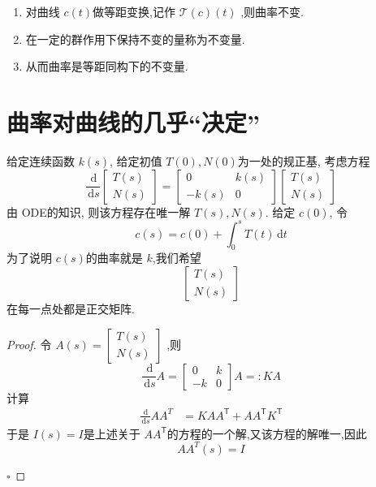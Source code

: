 \documentclass[../../古典微分几何.tex]{subfiles}
\begin{document}
\begin{remark}
    \begin{enumerate}
        \item 对曲线 \(  c \left( t \right)  \)做等距变换,记作 \(  \mathcal{T}\left( c \right)\left( t \right)    \)  ,则曲率不变.
        \item   在一定的群作用下保持不变的量称为不变量.
        \item 从而曲率是等距同构下的不变量.
    \end{enumerate}
    
    
\end{remark}

\section{曲率对曲线的几乎“决定”}

给定连续函数 \(  k\left( s \right)   \), 给定初值 \(  T\left( 0 \right),N\left( 0 \right)    \)为一处的规正基, 考虑方程 \[
\frac{\,\mathrm{d}  }{\,\mathrm{d} s } \begin{bmatrix} 
    T\left( s \right)\\ 
     N\left( s \right)   
\end{bmatrix} =  \begin{bmatrix} 
    0& k\left( s \right)\\ 
     -k\left( s \right)&0   
\end{bmatrix} \begin{bmatrix} 
    T\left( s \right)  \\ 
     N\left( s \right) 
\end{bmatrix}    
\]  由 ODE的知识, 则该方程存在唯一解 \(  T\left( s \right),N\left( s \right)    \).
给定 \(  c\left( 0 \right)   \), 令 \[
c\left( s \right)=  c\left( 0 \right)  +  \int_{0}^{s} T\left( t  \right)\,\mathrm{d} t  
\] 为了说明 \(  c\left( s \right)   \)的曲率就是 \(  k  \),我们希望 \[
\begin{bmatrix} 
    T\left( s \right)  \\ 
     N\left( s \right) 
\end{bmatrix} 
\]在每一点处都是正交矩阵.

\begin{proof}
    令 \(  A \left( s \right)=  \begin{bmatrix} 
        T\left( s \right)\\ 
         N\left( s \right)   
    \end{bmatrix}    \) ,则 \[
    \frac{\,\mathrm{d}  }{\,\mathrm{d} s }A =  \begin{bmatrix} 
        0&k\\ 
         -k&0 
    \end{bmatrix}A =: KA 
    \]计算 \[
    \begin{aligned}
        \frac{\,\mathrm{d}  }{\,\mathrm{d} s }A A^{T} & =  KA A^{\mathsf{T}}+ A A^{\mathsf{T}} K^{\mathsf{T}} 
    \end{aligned}
    \]于是 \(  I\left( s \right)= I   \)是上述关于 \(  A A^{\mathsf{T}}  \)的方程的一个解,又该方程的解唯一,因此 \[
    A A^{T}\left( s \right)  =  I
    \]  

    \hfill $\square$
\end{proof}
\end{document}
